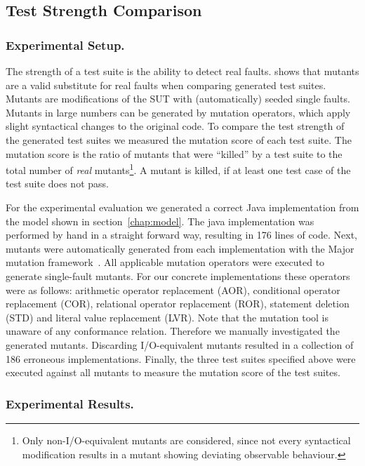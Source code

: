 \subsection{Test Strength Comparison}\label{sec:mutations}

\subsubsection*{Experimental Setup.}

The strength of a test suite is the ability to detect real faults. 
\cite{just_are_2014} shows that mutants are a valid substitute for real faults
when comparing generated test suites. Mutants are modifications of the SUT with (automatically) seeded single faults. 
Mutants in large numbers can be generated 
by mutation operators, which apply slight syntactical changes
to the original code.
To compare the test strength of the generated test suites we measured the mutation score of 
each test suite. The mutation score is the ratio of mutants that were
``killed'' by a test suite to the total number of \textit{real} mutants\footnote{Only non-I/O-equivalent mutants are considered, since not every 
syntactical modification results in a mutant showing deviating observable behaviour.}. A mutant is killed, if at least one test case of the test suite 
does not pass.

For the experimental evaluation we generated a correct Java implementation
from the model shown in section~\ref{chap:model}. The java implementation was performed by
hand in a straight forward way, resulting in 176 lines of code. Next, mutants
were automatically generated from each implementation with the Major mutation
framework~\cite{Just2014}.
All applicable mutation operators were executed to generate single-fault
mutants. For our concrete implementations these
operators were as follows:
arithmetic operator replacement (AOR),
conditional operator replacement (COR), relational operator replacement (ROR),
statement deletion (STD) and literal value replacement (LVR).
Note that the mutation tool is unaware of any conformance relation.
Therefore we manually investigated the generated mutants. Discarding I/O-equivalent mutants resulted  in
a collection of 186 erroneous
implementations.
Finally, the three test suites specified above were executed against
all mutants to measure the mutation score of the
test suites.




\subsubsection*{Experimental Results.}

